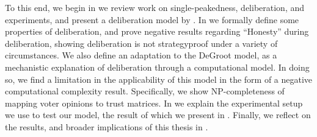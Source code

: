 To this end, we begin in  we review work on
single-peakedness, deliberation, and experiments, and present a
deliberation model by \citet{radDeliberationSinglePeakednessCoherent2021}. In
 we formally define some properties of deliberation, and prove
negative results regarding ``Honesty'' during deliberation, showing
deliberation is not strategyproof under a variety of circumstances. We also
define an adaptation to the DeGroot model, as a mechanistic explanation of
deliberation through a computational model. In doing so, we find a limitation
in the applicability of  this model in the form of a negative computational
complexity result. Specifically, we show NP-completeness of mapping voter opinions to trust
matrices. In  we explain the experimental setup we use to test
our model, the result of which we present in .
Finally, we reflect on the results, and broader implications of this thesis in .

